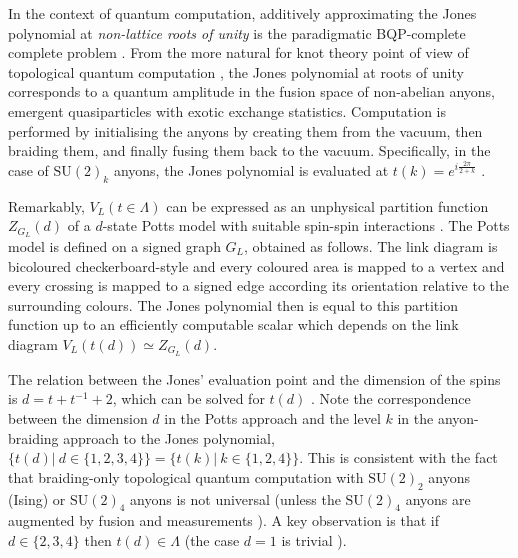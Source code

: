 In the context of quantum computation,
additively approximating the Jones polynomial at \emph{non-lattice roots of unity} is the paradigmatic BQP-complete complete problem \cite{Aharonov_2008,kuperberg2014hard}.
From the more natural for knot theory point of view
of topological quantum computation \cite{pachos_2012},
the Jones polynomial at roots of unity corresponds to a quantum amplitude in the fusion space of non-abelian anyons, emergent quasiparticles with exotic exchange statistics.
Computation is performed by initialising the anyons by creating them from the vacuum, then braiding them, and finally fusing them back to the vacuum.
Specifically, in the case of $\text{SU}(2)_k$ anyons, the Jones polynomial is evaluated at $t(k) = e^{i\frac{2\pi}{2+k}}$ \cite{Rowell_2018}.



Remarkably, $V_L(t\in\Lambda)$ can be expressed as an unphysical partition function $Z_{G_L}(d)$ of a $d$-state Potts model with suitable spin-spin interactions \cite{RevModPhys.64.1099}.
The Potts model is defined on a signed graph $G_L$, obtained as follows.
The link diagram is bicoloured checkerboard-style
and every coloured area is mapped to a vertex and every crossing is mapped to a signed edge according
its orientation relative to the surrounding colours.
The Jones polynomial then is equal to this partition function up to an efficiently computable scalar which depends on the link diagram  $V_L(t(d)) \simeq Z_{G_L}(d)$.

The relation between the Jones' evaluation point and the dimension of the spins is $d = t + t^{-1} +2$,
which can be solved for $t(d)$ \cite{PhysRevE.100.033303}.
Note the correspondence between the dimension $d$ in the Potts approach and the level $k$ in the anyon-braiding approach to the Jones polynomial, $\{t(d) | ~ d \in\{1,2,3,4\} \} = \{ t(k) | ~ k\in\{1,2,4\} \}$.
This is consistent with the fact that braiding-only topological quantum computation with $\text{SU}(2)_2$ anyons (Ising) or $\text{SU}(2)_4$ anyons is not universal (unless the $\text{SU}(2)_4$ anyons are augmented by fusion and measurements \cite{Levaillant_2015}).
A key observation is that if $d\in\{2,3,4\}$ then $t(d)\in\Lambda$ (the case $d=1$ is trivial \cite{jaeger_vertigan_welsh_1990}).

